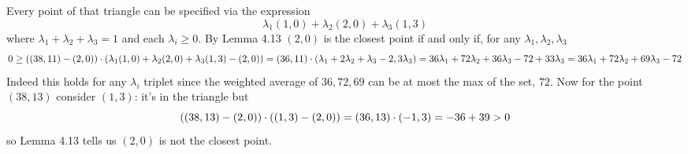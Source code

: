 \documentclass{article}
\newenvironment{ex}[1]
  {\renewcommand\theexercise{#1}\exercise}
  {\endexercise}
\begin{document}
\begin{ex}{4.14} %
  Every point of that triangle can be specified via the expression
  $$
  \lambda_1 (1, 0) + \lambda_2 (2, 0) + \lambda_3 (1, 3)
  $$
  where $\lambda_1 + \lambda_2 + \lambda_3 = 1$ and each $\lambda_i \ge 0$. By Lemma 4.13 $(2, 0)$ is the closest point if and only if, for any $\lambda_1,\lambda_2,\lambda_3$
  $$
  0 \ge ((38, 11) - (2,0)) \cdot (\lambda_1 (1, 0) + \lambda_2 (2, 0) + \lambda_3 (1, 3) - (2, 0)) = (36, 11) \cdot (\lambda_1 + 2\lambda_2 + \lambda_3 - 2, 3\lambda_3) = 36\lambda_1 + 72\lambda_2 + 36\lambda_3 - 72 + 33\lambda_3 = 36\lambda_1 + 72\lambda_2 + 69\lambda_3 - 72
  $$
  Indeed this holds for any $\lambda_i$ triplet since the weighted average of $36,72,69$ can be at most the max of the set, $72$. Now for the point $(38, 13)$ consider $(1, 3)$: it's in the triangle but
  $$
  ((38, 13) - (2, 0)) \cdot ((1, 3) - (2, 0)) = (36, 13) \cdot (-1, 3) = -36 + 39 > 0
  $$
  so Lemma 4.13 tells us $(2, 0)$ is not the closest point.
\end{ex} %
\end{document}
